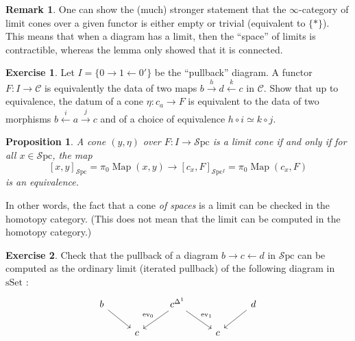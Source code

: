 \documentclass[11pt]{article}
\newtheorem{proposition}{Proposition}
\theoremstyle{definition}
\newtheorem{remark}{Remark}
\newtheorem{exercise}{Exercise}
\newcommand{\C}{\mathcal{C}}
\newcommand{\Map}{\operatorname{Map}}
\newcommand{\Spc}{\mathcal{S}\mathrm{pc}}
\newcommand{\sSet}{\mathrm{sSet}}
\begin{document}
\begin{remark}
    One can show the (much) stronger statement that the $\infty$-category of limit cones over a given functor is either empty or trivial (equivalent to $\{*\}$).
    This means that when a diagram has a limit, then the \enquote{space} of limits is contractible, whereas the lemma only showed that it is connected.
\end{remark}

\begin{exercise}
    Let $I = \{0 \to 1 \leftarrow 0'\}$ be the \enquote{pullback} diagram.
    A functor $F : I \to \C$ is equivalently the data of two maps $b \xrightarrow{h} d \xleftarrow{k} c$ in $\C$.
    Show that up to equivalence, the datum of a cone $\eta : c_a \to F$ is equivalent to the data of two morphisms $b \xleftarrow{i} a \xrightarrow{j} c$ and of a choice of equivalence $h \circ i \simeq k \circ j$.
\end{exercise}

\begin{proposition}
    A cone $(y, \eta)$ over $F : I \to \Spc$ is a limit cone if and only if for all $x \in \Spc$, the map
    \[
        [x, y]_{\Spc} = \pi_0 \Map(x, y) \to [c_x, F]_{\Spc^I} = \pi_0 \Map(c_x, F)
    \]
    is an equivalence.
\end{proposition}
In other words, the fact that a cone \emph{of spaces} is a limit can be checked in the homotopy category.
(This does not mean that the limit can be computed in the homotopy category.)

\begin{exercise}
    Check that the pullback of a diagram $b \to c \leftarrow d$ in $\Spc$ can be computed as the ordinary limit (iterated pullback) of the following diagram in $\sSet$ :
    \[\begin{tikzcd}
        b && {c^{\Delta^1}} && d \\
        & c && c
        \arrow[from=1-1, to=2-2]
        \arrow["{\mathrm{ev}_0}"', from=1-3, to=2-2]
        \arrow["{\mathrm{ev}_1}", from=1-3, to=2-4]
        \arrow[from=1-5, to=2-4]
    \end{tikzcd}\]
\end{exercise}
\end{document}
